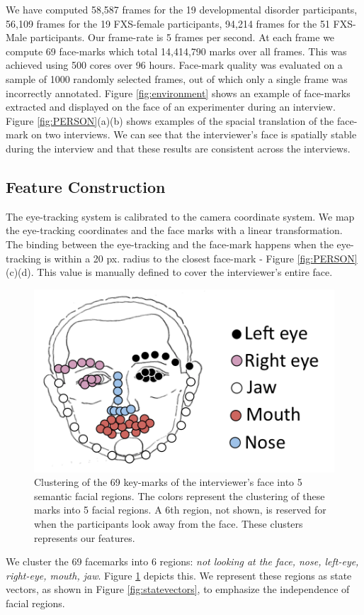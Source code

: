 \documentclass[10pt,twocolumn,letterpaper]{article}
\begin{document}
We have computed 58,587 frames for the 19 developmental disorder participants, 56,109 frames for the 19 FXS-female participants, 94,214 frames for the 51 FXS-Male participants. Our frame-rate is 5 frames per second. At each frame we compute 69 face-marks which total  14,414,790 marks over all frames. This was achieved using 500 cores over 96 hours. Face-mark quality was evaluated on a sample of 1000 randomly selected frames, out of which only a single frame was incorrectly annotated. Figure \ref{fig:environment} shows an example of face-marks extracted and displayed on the face of an experimenter during an interview. Figure \ref{fig:PERSON}(a)(b) shows examples of the spacial translation of the face-mark on two interviews. We can see that the interviewer's face is spatially stable during the interview and that these results are consistent across the interviews. 
 
\subsection{Feature Construction}
\label{ssec:feature_construction}
The eye-tracking system is calibrated to the camera coordinate system. We map the eye-tracking coordinates and the face marks with a linear transformation. The binding between the eye-tracking and the face-mark happens when the eye-tracking is within a 20 px. radius to the closest face-mark - Figure \ref{fig:PERSON}(c)(d). This value is manually defined to cover the interviewer's entire face.



\begin{figure}[h]
    \begin{center}
        \includegraphics[width=0.5\linewidth]{figures/face2.png}
    \end{center}
    \caption{Clustering of the 69 key-marks of the interviewer's face into 5 semantic facial regions. The colors represent the clustering of these marks into 5 facial regions. A 6th region, not shown, is reserved for when the participants look away from the face. These clusters represents our features.}
    \label{fig:feats}
\end{figure}
We cluster the 69 facemarks into 6 regions: \textit{not looking at the face, nose, left-eye, right-eye, mouth, jaw}. Figure \ref{fig:feats} depicts this. 
We represent these regions as state vectors, as shown in Figure  \ref{fig:statevectors}, to emphasize the independence of facial regions.
\end{document}
